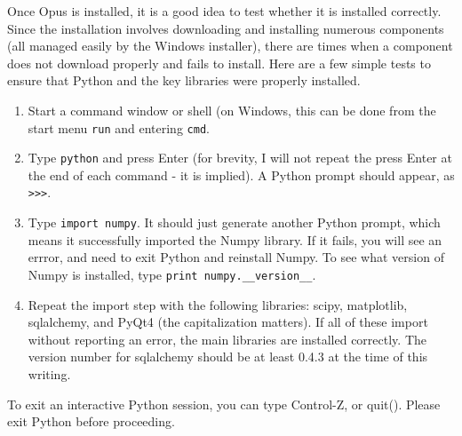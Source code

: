 Once Opus is installed, it is a good idea to test whether it is installed correctly.  Since the installation involves downloading and installing numerous components (all managed easily by the Windows installer), there are times when a component does not download properly and fails to install.  Here are a few simple tests to ensure that Python and the key libraries were properly installed.

\begin{enumerate}
\item Start a command window or shell (on Windows, this can be done from the start menu \verb#run# and entering \verb#cmd#.
\item Type \verb#python# and press Enter (for brevity, I will not repeat the press Enter at the end of each command - it is implied).  A Python prompt should appear, as \verb#>>>#.
\item Type \verb#import numpy#.  It should just generate another Python prompt, which means it successfully imported the Numpy library.  If it fails, you will see an errror, and need to exit Python and reinstall Numpy.  To see what version of Numpy is installed, type \verb#print numpy.__version__#.
\item Repeat the import step with the following libraries: scipy, matplotlib, sqlalchemy, and PyQt4 (the capitalization matters).  If all of these import without reporting an error, the main libraries are installed correctly.  The version number for sqlalchemy should be at least 0.4.3 at the time of this writing.
\end{enumerate}

To exit an interactive Python session, you can type Control-Z, or quit().  Please exit Python before proceeding.

